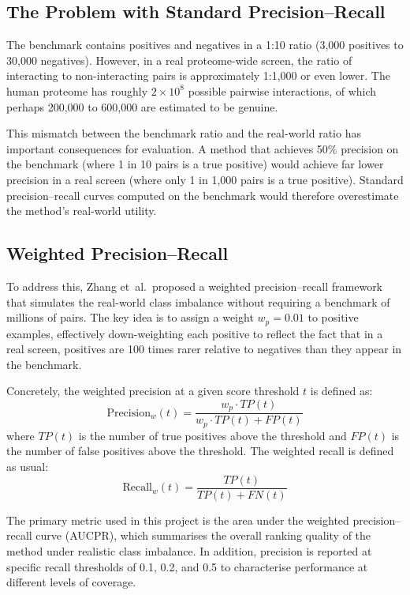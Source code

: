 \subsection{The Problem with Standard Precision--Recall}

The benchmark contains positives and negatives in a 1:10 ratio (3,000 positives to 30,000 negatives).
However, in a real proteome-wide screen, the ratio of interacting to non-interacting pairs is approximately 1:1,000 or even lower.
The human proteome has roughly $2 \times 10^{8}$ possible pairwise interactions, of which perhaps 200,000 to 600,000 are estimated to be genuine.

This mismatch between the benchmark ratio and the real-world ratio has important consequences for evaluation.
A method that achieves 50\% precision on the benchmark (where 1 in 10 pairs is a true positive) would achieve far lower precision in a real screen (where only 1 in 1,000 pairs is a true positive).
Standard precision--recall curves computed on the benchmark would therefore overestimate the method's real-world utility.

\subsection{Weighted Precision--Recall}

To address this, Zhang et~al.\ proposed a weighted precision--recall framework that simulates the real-world class imbalance without requiring a benchmark of millions of pairs.
The key idea is to assign a weight $w_p = 0.01$ to positive examples, effectively down-weighting each positive to reflect the fact that in a real screen, positives are 100 times rarer relative to negatives than they appear in the benchmark.

Concretely, the weighted precision at a given score threshold $t$ is defined as:
\[
\text{Precision}_w(t) = \frac{w_p \cdot TP(t)}{w_p \cdot TP(t) + FP(t)}
\]
where $TP(t)$ is the number of true positives above the threshold and $FP(t)$ is the number of false positives above the threshold.
The weighted recall is defined as usual:
\[
\text{Recall}_w(t) = \frac{TP(t)}{TP(t) + FN(t)}
\]

The primary metric used in this project is the area under the weighted precision--recall curve (AUCPR), which summarises the overall ranking quality of the method under realistic class imbalance.
In addition, precision is reported at specific recall thresholds of 0.1, 0.2, and 0.5 to characterise performance at different levels of coverage.

